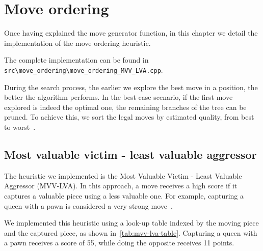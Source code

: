 \section{Move ordering}
 
Once having explained the move generator function, in this chapter we detail the implementation of the move ordering heuristic.

\vspace{1em}

\noindent \parbox{\textwidth}{The complete implementation can be found in\\\texttt{src\textbackslash{}move\_ordering\textbackslash{}move\_ordering\_MVV\_LVA.cpp}.}

\vspace{1em}

\noindent During the search process, the earlier we explore the best move in a position, the better the algorithm performs. In the best-case scenario, if the first move explored is indeed the optimal one, the remaining branches of the tree can be pruned. To achieve this, we sort the legal moves by estimated quality, from best to worst~\cite{MoveOrdering}.

\subsection*{Most valuable victim - least valuable aggressor}

The heuristic we implemented is the Most Valuable Victim - Least Valuable Aggressor (MVV-LVA). In this approach, a move receives a high score if it captures a valuable piece using a less valuable one. For example, capturing a queen with a pawn is considered a very strong move~\cite{MVVLVA}.

\vspace{1em}

\noindent We implemented this heuristic using a look-up table indexed by the moving piece and the captured piece, as shown in~\cref{tab:mvv-lva-table}. Capturing a queen with a pawn receives a score of 55, while doing the opposite receives 11 points.

